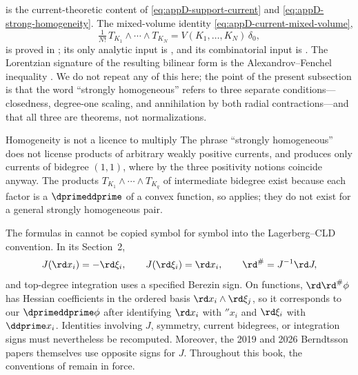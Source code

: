 \begin{remark}
\label{rem:ch14-homogeneous-appendix}
 is the current-theoretic content of
\eqref{eq:appD-support-current} and
\eqref{eq:appD-strong-homogeneity}.  The mixed-volume identity
\eqref{eq:appD-current-mixed-volume},
\[
 \tfrac1{N!}\,T_{K_1}\wedge\cdots\wedge T_{K_N}
 =V(K_1,\ldots,K_N)\,\delta_0,
\]
is proved in ; its only analytic
input is , and its combinatorial input is
.  The Lorentzian signature of the resulting
bilinear form is the Alexandrov--Fenchel inequality
.  We do not repeat any of this here; the point of the
present subsection is that the word ``strongly homogeneous'' refers to three
separate conditions---closedness, degree-one scaling, and annihilation by
both radial contractions---and that all three are theorems, not
normalizations.
\end{remark}

\begin{warning}{Homogeneity is not a licence to multiply}
The phrase ``strongly homogeneous'' does not license products of arbitrary
weakly positive currents, and
 produces only currents of bidegree
$(1,1)$, where by  the three positivity
notions coincide anyway.  The products
$T_{K_1}\wedge\cdots\wedge T_{K_q}$ of intermediate bidegree exist because
each factor is a $\dprimeddprime$ of a convex function, so
 applies; they do not exist for a general
strongly homogeneous pair.
\end{warning}

\begin{remark}
\label{rem:ch14-convention-firewall}
The formulas in \cite{Ber26Convex} cannot be copied symbol for symbol into
the Lagerberg--CLD convention.  In its Section~2,
\[
       J(\rd x_i)=-\rd\xi_i,\qquad J(\rd\xi_i)=\rd x_i,
       \qquad \rd^\#=J^{-1}\rd J,
\]
and top-degree integration uses a specified Berezin sign.  On functions,
$\rd\rd^\#\phi$ has Hessian coefficients in the ordered basis
$\rd x_i\wedge \rd\xi_j$, so it corresponds to our
$\dprimeddprime\phi$ after identifying $\rd x_i$ with $\dprime x_i$ and
$\rd\xi_i$ with $\ddprime x_i$.  Identities involving $J$, symmetry, current bidegrees, or
integration signs must nevertheless be recomputed.  Moreover, the 2019 and
2026 Berndtsson papers themselves use opposite signs for $J$.  Throughout
this book, the conventions of  remain in force.
\end{remark}

